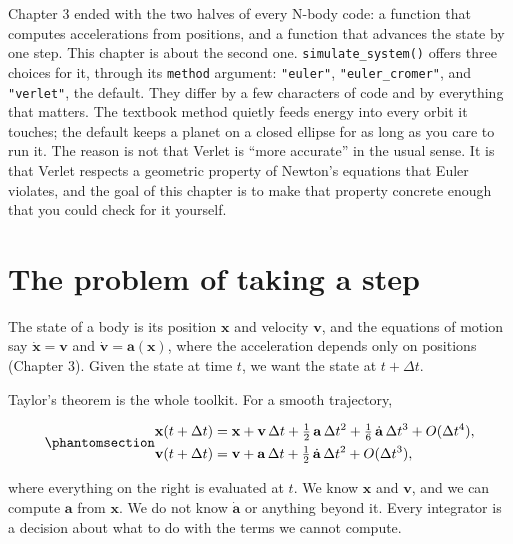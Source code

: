\documentclass[
  10.5pt,
  letterpaper,
]{scrbook}
\theoremstyle{definition}
\theoremstyle{plain}
\theoremstyle{remark}
\begin{document}
Chapter 3 ended with the two halves of every N-body code: a function
that computes accelerations from positions, and a function that advances
the state by one step. This chapter is about the second one.
\texttt{simulate\_system()} offers three choices for it, through its
\texttt{method} argument: \texttt{"euler"}, \texttt{"euler\_cromer"},
and \texttt{"verlet"}, the default. They differ by a few characters of
code and by everything that matters. The textbook method quietly feeds
energy into every orbit it touches; the default keeps a planet on a
closed ellipse for as long as you care to run it. The reason is not that
Verlet is ``more accurate'' in the usual sense. It is that Verlet
respects a geometric property of Newton's equations that Euler violates,
and the goal of this chapter is to make that property concrete enough
that you could check for it yourself.

\section{The problem of taking a
step}\label{the-problem-of-taking-a-step}

The state of a body is its position \(\mathbf{x}\) and velocity
\(\mathbf{v}\), and the equations of motion say
\(\dot{\mathbf{x}} = \mathbf{v}\) and
\(\dot{\mathbf{v}} = \mathbf{a}(\mathbf{x})\), where the acceleration
depends only on positions (Chapter 3). Given the state at time \(t\), we
want the state at \(t + \Delta t\).

Taylor's theorem is the whole toolkit. For a smooth trajectory,

\begin{equation}\protect\phantomsection\label{eq-taylor}{
\begin{aligned}
\mathbf{x}(t+\Delta t) &= \mathbf{x} + \mathbf{v}\,\Delta t + \tfrac12\,\mathbf{a}\,\Delta t^2 + \tfrac16\,\dot{\mathbf{a}}\,\Delta t^3 + O(\Delta t^4), \\
\mathbf{v}(t+\Delta t) &= \mathbf{v} + \mathbf{a}\,\Delta t + \tfrac12\,\dot{\mathbf{a}}\,\Delta t^2 + O(\Delta t^3),
\end{aligned}
}\end{equation}

where everything on the right is evaluated at \(t\). We know
\(\mathbf{x}\) and \(\mathbf{v}\), and we can compute \(\mathbf{a}\)
from \(\mathbf{x}\). We do not know \(\dot{\mathbf{a}}\) or anything
beyond it. Every integrator is a decision about what to do with the
terms we cannot compute.
\end{document}
